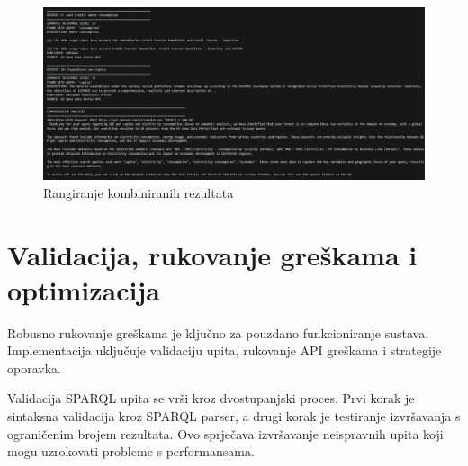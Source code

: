 \begin{figure}[htbp]
    \centering
    \includegraphics[width=1\textwidth]{figures/ranking_combined_results2.png}
    \caption{Rangiranje kombiniranih rezultata}
    \label{fig:unified_data_assistant}
\end{figure}

\section{Validacija, rukovanje greškama i optimizacija}

Robusno rukovanje greškama je ključno za pouzdano funkcioniranje sustava. Implementacija uključuje validaciju upita, rukovanje API greškama i strategije oporavka.

Validacija SPARQL upita se vrši kroz dvostupanjski proces. Prvi korak je sintaksna validacija kroz SPARQL parser, a drugi korak je testiranje izvršavanja s ograničenim brojem rezultata. Ovo sprječava izvršavanje neispravnih upita koji mogu uzrokovati probleme s performansama.

